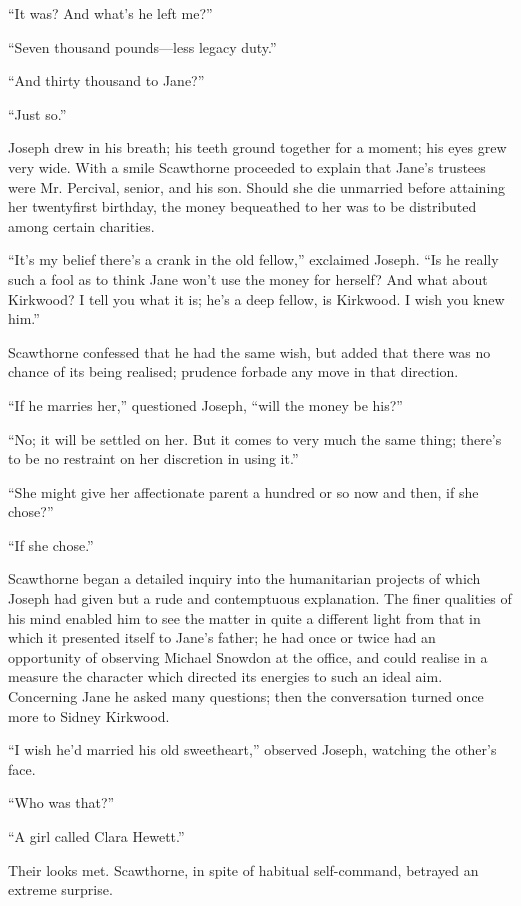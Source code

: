 ``It was? And what's he left me?''

``Seven thousand pounds---less legacy duty.''

``And thirty thousand to Jane?''

``Just so.''

Joseph drew in his breath; his teeth ground together for a moment; his
eyes grew very wide. With a smile Scawthorne proceeded to explain that
Jane's trustees were Mr. Percival, senior, and his son. Should she
{\protect\hypertarget{188}{}{}}die unmarried before attaining her
twentyfirst birthday, the money bequeathed to her was to be distributed
among certain charities.

``It's my belief there's a crank in the old fellow,'' exclaimed Joseph.
``Is he really such a fool as to think Jane won't use the money for
herself? And what about Kirkwood? I tell you what it is; he's a deep
fellow, is Kirkwood. I wish you knew him.''

Scawthorne confessed that he had the same wish, but added that there was
no chance of its being realised; prudence forbade any move in that
direction.

``If he marries her,'' questioned Joseph, ``will the money be his?''

``No; it will be settled on her. But it comes to very much the same
thing; there's to be no restraint on her discretion in using it.''

``She might give her affectionate parent a hundred or so now and then,
if she chose?''

``If she chose.''

Scawthorne began a detailed inquiry into the humanitarian projects of
which Joseph had given but a rude and contemptuous
{\protect\hypertarget{189}{}{}}explanation. The finer qualities of his
mind enabled him to see the matter in quite a different light from that
in which it presented itself to Jane's father; he had once or twice had
an opportunity of observing Michael Snowdon at the office, and could
realise in a measure the character which directed its energies to such
an ideal aim. Concerning Jane he asked many questions; then the
conversation turned once more to Sidney Kirkwood.

``I wish he'd married his old sweetheart,'' observed Joseph, watching
the other's face.

``Who was that?''

``A girl called Clara Hewett.''

Their looks met. Scawthorne, in spite of habitual self-command, betrayed
an extreme surprise.

